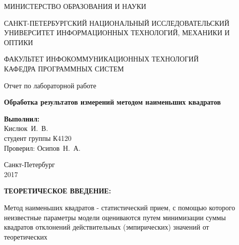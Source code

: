 \documentclass[14pt,a4paper]{extreport}
\newcommand{\header}[1]{%
{
\clearpage%
\fontsize{16pt}{14pt}\selectfont
\begin{center}
\textbf{\MakeUppercase{#1}:}
\end{center}
}
}
\newcommand{\labyear}{2017}
\newcommand{\labtitle}{Обработка результатов измерений методом наименьших квадратов}
\newcommand{\prepod}{Осипов~Н.~А.}
\newcommand{\student}{Кислюк~И.~В.}
\begin{document}
	\begin{titlepage}
	\begin{center}	
		\fontsize{14pt}{14pt}\selectfont
		МИНИСТЕРСТВО ОБРАЗОВАНИЯ И НАУКИ\\

		\vspace*{0.6\baselineskip}

		\MakeUppercase{Санкт-Петербургский Национальный Исследовательский Университет Информационных технологий, механики и оптики}		
		
		\vspace*{0.6\baselineskip}
		\MakeUppercase{Факультет Инфокоммуникационных технологий}\\
		\MakeUppercase{Кафедра программных систем}
	
		\vspace*{7\baselineskip}
		\fontsize{19pt}{18pt}\selectfont
		Отчет по лабораторной работе
		
		\fontsize{20pt}{18pt}\selectfont
		\textbf{\labtitle}\\
		\vspace*{1.15\baselineskip}
		\end{center}
	
	\vspace*{2\baselineskip}
	\begin{flushright}
	\fontsize{14pt}{14pt}\selectfont
	\textbf{Выполнил:}\\
	\student\\
	студент группы К4120\\
	Проверил: \prepod\\
	\end{flushright}
	
	\vspace{\fill}
	\begin{center}
	Санкт-Петербург\\
	\vspace{-1ex}
	\labyear
	\end{center}
	
\end{titlepage}

\fontsize{14pt}{14pt}\selectfont

\header{Теоретическое введение}

Метод наименьших квадратов - статистический прием, с помощью которого неизвестные параметры модели оцениваются путем минимизации суммы квадратов отклонений действительных (эмпирических) значений от теоретических
\end{document}
